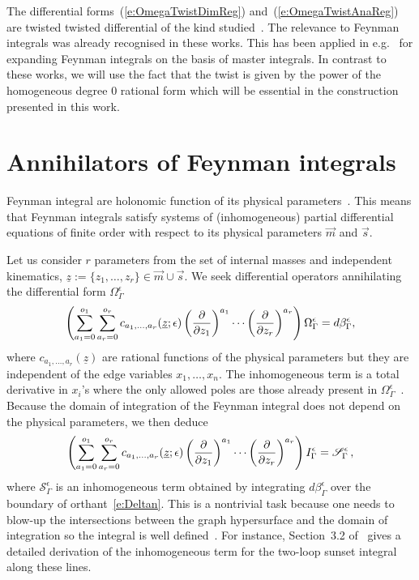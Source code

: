 \documentclass[a4paper,12pt]{article}
\numberwithin{equation}{section}
\numberwithin{figure}{section}
\begin{document}
The differential forms~(\ref{e:OmegaTwistDimReg})
and~(\ref{e:OmegaTwistAnaReg}) are twisted
twisted differential of the kind
studied~\cite{Aomoto1,Aomoto,Aomoto_1982,AomotoBook}.
The
relevance to Feynman integrals was already recognised in these works. 
This has been applied in
e.g.~\cite{Mizera:2017rqa,Frellesvig:2019uqt,Cacciatori:2021nli,Munch:2023ifm,Brunello:2023rpq,Teschke:2024bct}  for
expanding Feynman integrals on the basis of master integrals. In contrast to these works, 
%
we will use
the fact that the twist is given by
the power of the homogeneous degree 0 rational form
which will be essential
in the construction presented in this work.


\section{Annihilators of Feynman integrals}
\label{sec:Red}
Feynman integral are holonomic function of its physical parameters~\cite{Kashiwara:1977nf, Bitoun:2017nre, Smirnov:2010hn,Lee:2013hzt}. This means that Feynman integrals satisfy systems of  (inhomogeneous) partial
differential equations of finite order with respect to its physical
parameters $\vec m$ and $\vec s$.

Let us consider $r$ parameters from the set of internal masses and independent kinematics, $\underline z:=\{z_1,\dots,z_r\} \in \vec m \cup \vec s $. 
%
 We seek 
 differential operators 
annihilating the differential form $\Omega_\Gamma^\epsilon$ 
\begin{equation}\label{e:PFOmegaGeneric}
\left(  \sum_{a_1=0}^{o_1} \sum_{ a_r=0}^{o_r}  c_{a_1,\dots, a_r}(\underline z;\epsilon) \left(\partial\over \partial z_1\right)^{a_1}\cdots\left(\partial
  \over\partial z_r\right)^{a_r}  \right)\Omega_\Gamma^\epsilon=d\beta^\epsilon_\Gamma,
\end{equation}
where $  c_{a_1,\dots, a_r}(\underline z)$ are rational functions of the physical
parameters but they are independent of the edge variables $x_1,\dots,x_n$. The inhomogeneous term is a total derivative in $x_i$'s where the only allowed poles are those already present in $\Omega_\Gamma^\epsilon$~\cite{Lairez:2022zkj}.
%
Because the domain of integration of the Feynman integral does not
depend on the physical parameters, we then deduce
\begin{equation}\label{e:PDEintFeynman}
  \left( \sum_{a_1=0}^{o_1} \sum_{ a_r=0}^{o_r}  c_{a_1,\dots, a_r}(\underline z;\epsilon) \left(\partial\over \partial z_1\right)^{a_1}\cdots\left(\partial
  \over\partial z_r\right)^{a_r}  \right)I^\epsilon_\Gamma=\mathscr{S}^\epsilon_\Gamma \, ,
\end{equation}
where $\mathscr{S}^\epsilon_\Gamma$ is an inhomogeneous term obtained by
integrating $d\beta^\epsilon_\Gamma$ over the boundary of
orthant~\eqref{e:Deltan}.
This is a nontrivial task because one needs
to blow-up the intersections between the graph hypersurface and the
domain of integration so the integral is well
defined~\cite{bek,Brown:2009ta,Bloch:2016izu,muller2014picard}. For
instance, 
Section~3.2 of~\cite{Bloch:2016izu} gives  a detailed derivation of the inhomogeneous term for
the two-loop sunset integral along these lines.
\end{document}
